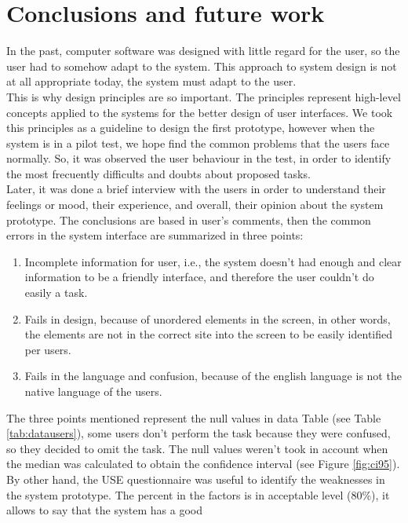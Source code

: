 \chapter{Conclusions and future work} \label{conclusions}

In the past, computer software was designed with little regard for the
user, so the user had to somehow adapt to the system. This approach to
system design is not at all appropriate today, the system must adapt
to the user. \\ This is why design principles  \cite{gong2004guidelines} 
are so important. The principles represent high-level concepts 
applied to the systems for the better design of user interfaces. 
We took this principles as a guideline to design the first prototype, 
however  when the system is in a pilot test, we hope find the 
common problems that the users face normally.
So, it was observed the user behaviour in the test, in order to identify
the most frecuently difficults and doubts about proposed tasks.\\ 
Later, it was done a brief interview with the users in order to 
understand their feelings or mood, their
experience, and overall, their opinion about the system prototype.  
The conclusions are based in user's comments, then the common errors 
in the system interface are summarized in three points:
\begin{enumerate}  
\item  Incomplete information for user, i.e., the system doesn't had
enough and clear information to be a friendly interface, and
therefore the user couldn't do easily a task.
\item Fails in design, because of unordered elements in the screen, 
in other words, the elements are not in the correct site into the 
screen to be easily identified per users.
\item Fails in the language and confusion, because of the english 
language is not the native language of the users.
\end{enumerate}
The three points mentioned represent the null values in data
Table (see Table  \ref{tab:datausers}), some users don't perform the task
because they were confused, so they decided to omit the task. The null
values weren't took in account when the median was calculated to obtain the
confidence interval (see Figure  \ref{fig:ci95}).\\  
By other hand, the USE questionnaire was useful to identify the
weaknesses in the system prototype. The percent in the factors is in
acceptable level (80\%), it allows to say that the system has a good
